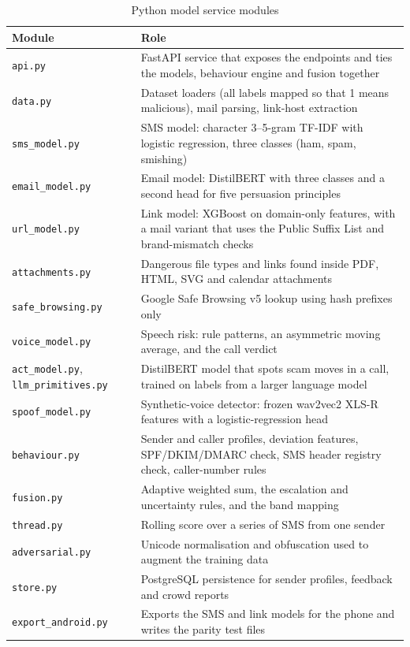 {\begin{table}[H]
\caption{Python model service modules}
\label{tab:modpy}
\centering\small{}
\begin{tabular}{|p{3.6cm}|p{10.6cm}|}
\hline
\textbf{Module} & \textbf{Role} \\ \hline
\texttt{api.py} & FastAPI service that exposes the endpoints and ties the models, behaviour engine and fusion together \\ \hline
\texttt{data.py} & Dataset loaders (all labels mapped so that 1 means malicious), mail parsing, link-host extraction \\ \hline
\texttt{sms\_model.py} & SMS model: character 3--5-gram TF-IDF with logistic regression, three classes (ham, spam, smishing) \\ \hline
\texttt{email\_model.py} & Email model: DistilBERT with three classes and a second head for five persuasion principles \\ \hline
\texttt{url\_model.py} & Link model: XGBoost on domain-only features, with a mail variant that uses the Public Suffix List and brand-mismatch checks \\ \hline
\texttt{attachments.py} & Dangerous file types and links found inside PDF, HTML, SVG and calendar attachments \\ \hline
\texttt{safe\_browsing.py} & Google Safe Browsing v5 lookup using hash prefixes only \\ \hline
\texttt{voice\_model.py} & Speech risk: rule patterns, an asymmetric moving average, and the call verdict \\ \hline
\texttt{act\_model.py}, \texttt{llm\_primitives.py} & DistilBERT model that spots scam moves in a call, trained on labels from a larger language model \\ \hline
\texttt{spoof\_model.py} & Synthetic-voice detector: frozen wav2vec2 XLS-R features with a logistic-regression head \\ \hline
\texttt{behaviour.py} & Sender and caller profiles, deviation features, SPF/DKIM/DMARC check, SMS header registry check, caller-number rules \\ \hline
\texttt{fusion.py} & Adaptive weighted sum, the escalation and uncertainty rules, and the band mapping \\ \hline
\texttt{thread.py} & Rolling score over a series of SMS from one sender \\ \hline
\texttt{adversarial.py} & Unicode normalisation and obfuscation used to augment the training data \\ \hline
\texttt{store.py} & PostgreSQL persistence for sender profiles, feedback and crowd reports \\ \hline
\texttt{export\_android.py} & Exports the SMS and link models for the phone and writes the parity test files \\ \hline
\end{tabular}
\end{table}

}
